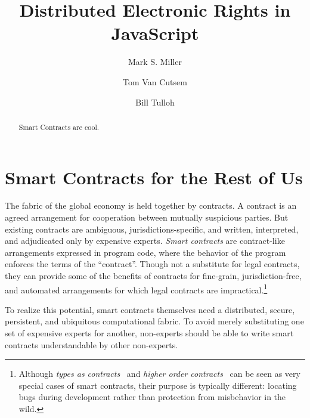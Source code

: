 \documentclass{llncs}
\begin{document}
\sloppypar


\title{Distributed Electronic Rights in JavaScript}

\author{Mark S. Miller \and Tom Van Cutsem \and Bill Tulloh }


\maketitle    

\begin{abstract}

Smart Contracts are cool. 

\end{abstract}

\section{Smart Contracts for the Rest of Us}

The fabric of the global economy is held together by contracts. A contract is an agreed arrangement for cooperation between mutually suspicious parties. But existing contracts are ambiguous, jurisdictions-specific, and written, interpreted, and adjudicated only by expensive experts. \emph{Smart contracts} are contract-like arrangements expressed in program code, where the behavior of the program enforces the terms of the ``contract''\cite{szabo1997formalizing}. Though not a substitute for legal contracts, they can provide some of the benefits of contracts for fine-grain, jurisdiction-free, and automated arrangements for which legal contracts are impractical.\footnote{
%
Although \emph{types as contracts}~\cite{DBLP:journals/computer/Meyer92} and \emph{higher order contracts}~\cite{findler2002contracts} can be seen as very special cases of smart contracts, their purpose is typically different: locating bugs during development rather than protection from misbehavior in the wild.}

To realize this potential, smart contracts themselves need a distributed, secure, persistent, and ubiquitous computational fabric. To avoid merely substituting one set of expensive experts for another, non-experts should be able to write smart contracts understandable by other non-experts.
\end{document}
